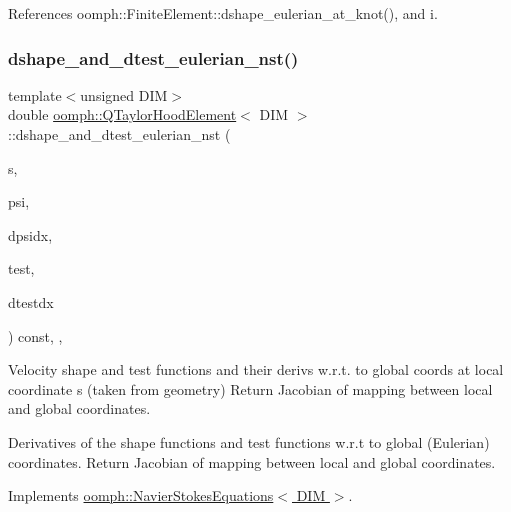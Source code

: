 References oomph\+::\+Finite\+Element\+::dshape\+\_\+eulerian\+\_\+at\+\_\+knot(), and i.

\mbox{\label{classoomph_1_1QTaylorHoodElement_a50722aac3b81372e6eab8eda39680783}} 
\subsubsection{\texorpdfstring{dshape\+\_\+and\+\_\+dtest\+\_\+eulerian\+\_\+nst()}{dshape\_and\_dtest\_eulerian\_nst()}}
{\footnotesize\ttfamily template$<$unsigned D\+IM$>$ \\
double \hyperlink{classoomph_1_1QTaylorHoodElement}{oomph\+::\+Q\+Taylor\+Hood\+Element}$<$ D\+IM $>$\+::dshape\+\_\+and\+\_\+dtest\+\_\+eulerian\+\_\+nst (\begin{DoxyParamCaption}\item[{const \hyperlink{classoomph_1_1Vector}{Vector}$<$ double $>$ \&}]{s,  }\item[{\hyperlink{classoomph_1_1Shape}{Shape} \&}]{psi,  }\item[{\hyperlink{classoomph_1_1DShape}{D\+Shape} \&}]{dpsidx,  }\item[{\hyperlink{classoomph_1_1Shape}{Shape} \&}]{test,  }\item[{\hyperlink{classoomph_1_1DShape}{D\+Shape} \&}]{dtestdx }\end{DoxyParamCaption}) const\hspace{0.3cm}{\ttfamily [inline]}, {\ttfamily [protected]}, {\ttfamily [virtual]}}



Velocity shape and test functions and their derivs w.\+r.\+t. to global coords at local coordinate s (taken from geometry) Return Jacobian of mapping between local and global coordinates. 

Derivatives of the shape functions and test functions w.\+r.\+t to global (Eulerian) coordinates. Return Jacobian of mapping between local and global coordinates. 

Implements \hyperlink{classoomph_1_1NavierStokesEquations_aeea4a1a3035ef93deaa68cc869e67dd8}{oomph\+::\+Navier\+Stokes\+Equations$<$ D\+I\+M $>$}.



